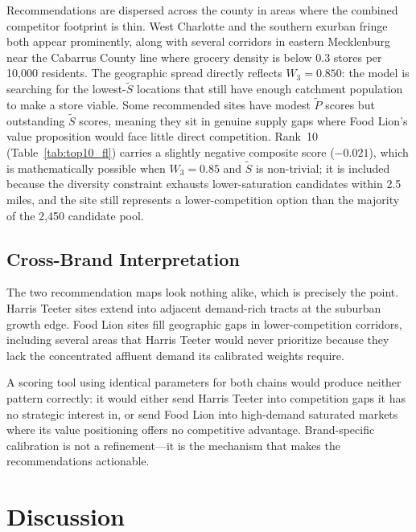 \documentclass[conference]{IEEEtran}
\begin{document}
Recommendations are dispersed across the county in areas where the
combined competitor footprint is thin. West Charlotte and the southern
exurban fringe both appear prominently, along with several corridors
in eastern Mecklenburg near the Cabarrus County line where grocery
density is below 0.3 stores per 10{,}000 residents. The geographic
spread directly reflects $W_3 = 0.850$: the model is searching for
the lowest-$\widetilde{S}$ locations that still have enough catchment
population to make a store viable. Some recommended sites have modest
$\widetilde{P}$ scores but outstanding $\widetilde{S}$ scores,
meaning they sit in genuine supply gaps where Food Lion's value
proposition would face little direct competition. Rank~10
(Table~\ref{tab:top10_fl}) carries a slightly negative composite
score ($-0.021$), which is mathematically possible when $W_3 = 0.85$
and $\widetilde{S}$ is non-trivial; it is included because the
diversity constraint exhausts lower-saturation candidates within
2.5\,miles, and the site still represents a lower-competition option
than the majority of the 2{,}450 candidate pool.

\subsection{Cross-Brand Interpretation}

The two recommendation maps look nothing alike, which is precisely
the point. Harris Teeter sites extend into adjacent demand-rich tracts
at the suburban growth edge. Food Lion sites fill geographic gaps in
lower-competition corridors, including several areas that Harris
Teeter would never prioritize because they lack the concentrated
affluent demand its calibrated weights require.

A scoring tool using identical parameters for both chains would
produce neither pattern correctly: it would either send Harris Teeter
into competition gaps it has no strategic interest in, or send Food
Lion into high-demand saturated markets where its value positioning
offers no competitive advantage. Brand-specific calibration is not a
refinement---it is the mechanism that makes the recommendations
actionable.

\section{Discussion}
\label{sec:discussion}
\end{document}

